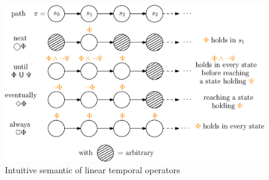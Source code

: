 \begin{figure}[h]
  \centering
  \includegraphics[width=0.85\linewidth]{resources/LTL}
  \caption{Intuitive semantic of linear temporal operators}\label{ltl}
\end{figure}


